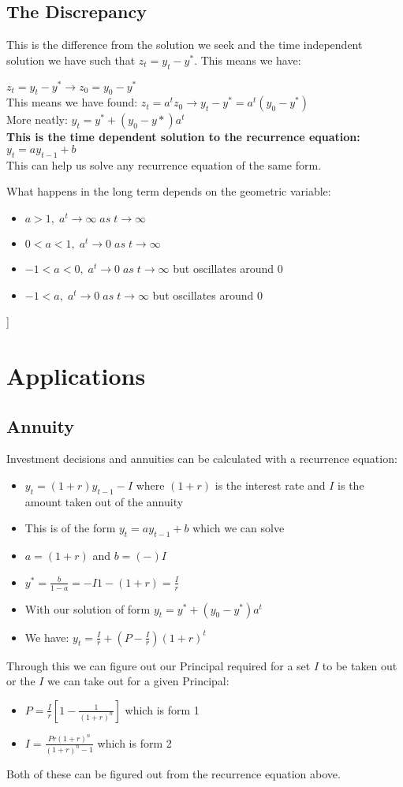 \documentclass[12pt, letterpaper]{article}
\begin{document}
\subsection{The Discrepancy}
This is the difference from the solution we seek and the time independent solution we have such that $z_t = y_t - y^*$. This means we have:
\begin{center}
	$z_t = y_t - y^* \rightarrow z_0 = y_0 - y^*$\\
	This means we have found: $z_t = a^tz_0 \rightarrow y_t - y^* = a^t(y_0-y^*)$\\
	More neatly: $y_t=y^*+(y_0-y*)a^t$\\
	\textbf{This is the time dependent solution to the recurrence equation:}\\
	$y_t = ay_{t-1}+b$\\
	This can help us solve any recurrence equation of the same form.
\end{center}
What happens in the long term depends on the geometric variable:
\begin{itemize}
	\item $a > 1,\;  a^t \rightarrow \infty\; as \; t\rightarrow \infty$
	\item $0 < a < 1,\; a^t \rightarrow 0\; as \; t\rightarrow \infty$
	\item $-1 < a < 0, \; a^t \rightarrow 0\; as \; t\rightarrow \infty$ but oscillates around 0
	\item $-1 < a, \; a^t \rightarrow 0\; as \; t\rightarrow \infty$ but oscillates around 0
\end{itemize}]
\section{Applications}
\subsection{Annuity}
Investment decisions and annuities can be calculated with a recurrence equation:
\begin{itemize}
	\item $y_t = (1+r)y_{t-1}-I$ where $(1+r)$ is the interest rate and $I$ is the amount taken out of the annuity
	\item This is of the form $y_t = ay_{t-1}+b$ which we can solve
	\item $a=(1+r)$ and $b=(-)I$
	\item $y^* = \frac{b}{1-a} = {-I}{1-(1+r)} = \frac{I}{r}$
	\item With our solution of form $y_t=y^* + (y_0 - y^*)a^t$
	\item We have: $y_t = \frac{I}{r} + (P - \frac{I}{r})(1+r)^t$
\end{itemize}
Through this we can figure out our Principal required for a set $I$ to be taken out or the $I$ we can take out for a given Principal:
\begin{itemize}
	\item $P = \frac{I}{r}[1-\frac{1}{(1+r)^n}]$ which is form 1
	\item $I = \frac{Pr(1+r)^n}{(1+r)^n-1}$ which is form 2
\end{itemize}
Both of these can be figured out from the recurrence equation above.
\end{document}
